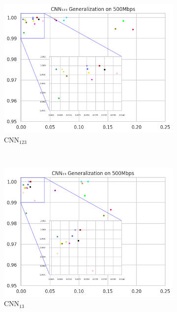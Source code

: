 \documentclass[a4paper,fleqn]{cas-sc}
\begin{document}
\begin{figure}[h!]
\begin{minipage}[t]{0.46\textwidth}
		\begin{subfigure}[t]{0.33\textwidth}
			\includegraphics[draft=false, width=\textwidth]{./figs/Generalizacao-CNN123-500Mbps.png} 
			\caption{CNN$_{123}$}
			\label{fig:Generalizacao-CNN123-500Mbps}
		\end{subfigure}%
		~
		\begin{subfigure}[t]{0.33\textwidth}
			\includegraphics[draft=false, width=\textwidth]{./figs/Generalizacao-CNN13-500Mbps.png} 
			\caption{CNN$_{13}$}
			\label{fig:Generalizacao-CNN13-500Mbps}
		\end{subfigure}%
		~
		\begin{subfigure}[t]{0.33\textwidth}

\end{subfigure}
\end{minipage}
\end{figure}
\end{document}
